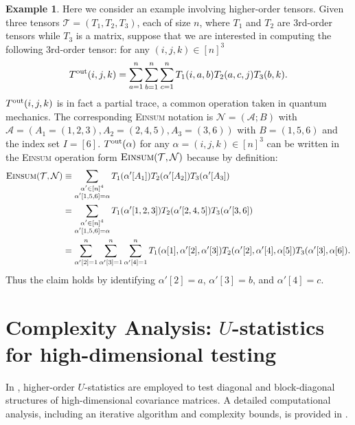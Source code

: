 \documentclass[sn-mathphys, natbib=false]{sn-jnl}
\theoremstyle{plain}
\theoremstyle{definition}
\newtheorem{example}{Example}
\def\Einsum{\textsc{Einsum}}
\newcommand{\tensorcontraction}{\textsc{Einsum}}
\def\calA{\mathcal{A}}
\def\calT{\mathcal{T}}
\def\calN{\mathcal{N}}
\begin{document}
\begin{bibunit}[agsm]
\allowdisplaybreaks
\begin{example}
\label{eg:tensor}
Here we consider an example involving higher-order tensors. Given three tensors $\calT = (T_1, T_2, T_3)$, each of size $n$, where $T_1$ and $T_2$ are 3rd-order tensors while $T_3$ is a matrix, suppose that we are interested in computing the following 3rd-order tensor: for any $(i, j, k) \in [n]^{3}$
\begin{align*}
T^{\rm out} (i, j, k) = \sum_{a = 1}^{n} \sum_{b = 1}^{n} \sum_{c = 1}^{n} T_{1} (i, a, b) T_{2} (a, c, j) T_{3} (b, k).
\end{align*}
$T^{\rm out} (i, j, k)$ is in fact a partial trace, a common operation taken in quantum mechanics. The corresponding \Einsum{} notation is $\calN = (\calA; B)$ with $\calA = (A_1 = (1, 2, 3), A_2 = (2, 4, 5), A_3 = (3, 6))$ with $B = (1, 5, 6)$ and the index set $I = [6]$. $T^{\rm out} (\alpha)$ for any $\alpha = (i, j, k) \in [n]^{3}$ can be written in the \Einsum{} operation form $\tensorcontraction(\calT, \calN)$ because by definition:
\begin{align*}
\tensorcontraction (\calT, \calN) & \equiv \sum_{\substack{\alpha' \in [n]^4 \\ \alpha' [1, 5, 6] = \alpha}} T_1 (\alpha' [A_1]) T_2 (\alpha' [A_2]) T_3 (\alpha' [A_3]) \\
& = \sum_{\substack{\alpha' \in [n]^4 \\ \alpha' [1, 5, 6] = \alpha}} T_1 (\alpha' [1, 2, 3]) T_2 (\alpha' [2, 4, 5]) T_3 (\alpha' [3, 6]) \\
& = \sum_{\alpha' [2] = 1}^{n} \sum_{\alpha' [3] = 1}^{n} \sum_{\alpha' [4] = 1}^{n} T_{1} (\alpha [1], \alpha' [2], \alpha' [3]) T_{2} (\alpha' [2], \alpha' [4], \alpha [5]) T_{3} (\alpha' [3], \alpha [6]).
\end{align*}
Thus the claim holds by identifying $\alpha' [2] = a$, $\alpha' [3] = b$, and $\alpha' [4] = c$.
\end{example}

\section{Complexity Analysis: $U$-statistics for high-dimensional testing}
\label{app:examples_complexity}

In \cite{he2021asymptotically,lai2023block}, higher-order $U$-statistics are employed to test diagonal and block-diagonal structures of high-dimensional covariance matrices. A detailed computational analysis, including an iterative algorithm and complexity bounds, is provided in \cite{he2021asymptotically}.


\end{bibunit}
\end{document}
